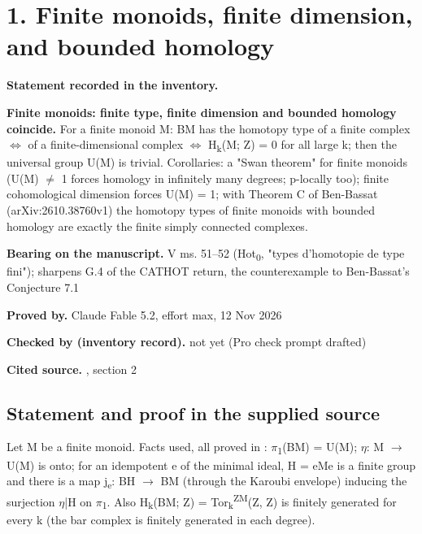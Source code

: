 \section*{1. Finite monoids, finite dimension, and bounded homology}


\label{nr:entry1}

\noindent\textbf{Statement recorded in the inventory.}\par\smallskip

\textbf{Finite monoids: finite type, finite dimension and bounded homology coincide.} For a finite monoid M: BM has the homotopy type of a finite complex \ensuremath{\Leftrightarrow} of a finite-dimensional complex \ensuremath{\Leftrightarrow} H\textsubscript{k}(M; Z) = 0 for all large k; then the universal group U(M) is trivial. Corollaries: a "Swan theorem" for finite monoids (U(M) \ensuremath{\ne} 1 forces homology in infinitely many degrees; p-locally too); finite cohomological dimension forces U(M) = 1; with Theorem C of Ben-Bassat (arXiv:2610.38760v1) the homotopy types of finite monoids with bounded homology are exactly the finite simply connected complexes.


\noindent\textbf{Bearing on the manuscript.} V ms. 51--52 (Hot\textsubscript{0}, "types d'homotopie de type fini"); sharpens G.4 of the CATHOT return, the counterexample to Ben-Bassat's Conjecture 7.1\par\smallskip

\noindent\textbf{Proved by.} Claude Fable 5.2, effort max, 12 Nov 2026\par

\noindent\textbf{Checked by (inventory record).} not yet (Pro check prompt drafted)\par\smallskip

\noindent\textbf{Cited source.} , section 2\par\medskip

\subsection*{Statement and proof in the supplied source}

Let M be a finite monoid. Facts used, all proved in : \ensuremath{\pi}\textsubscript{1}(BM) = U(M); \ensuremath{\eta}: M \ensuremath{\to} U(M) is onto; for an idempotent e of the minimal ideal, H = eMe is a finite group and there is a map j\textsubscript{e}: BH \ensuremath{\to} BM (through the Karoubi envelope) inducing the surjection \ensuremath{\eta}|H on \ensuremath{\pi}\textsubscript{1}. Also H\textsubscript{k}(BM; Z) = Tor\textsubscript{k}\textsuperscript{ZM}(Z, Z) is finitely generated for every k (the bar complex is finitely generated in each degree).

